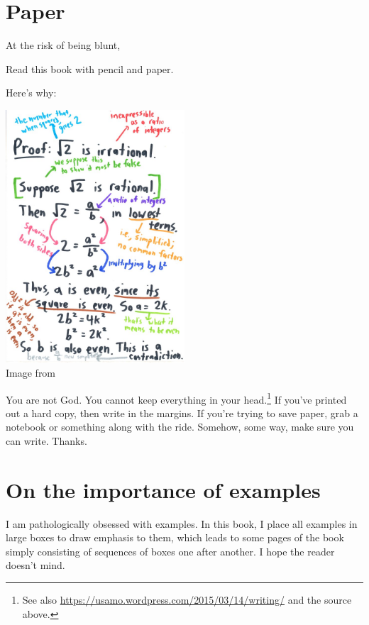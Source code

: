 
\section{Paper}
At the risk of being blunt,
\begin{moral}
Read this book with pencil and paper.
\end{moral}
Here's why:

\begin{center}
	\includegraphics[width=0.5\textwidth]{media/read-with-pencil.jpg}
	\\ \scriptsize Image from \cite{img:read_with_pencil}
\end{center}
You are not God.
You cannot keep everything in your head.\footnote{
	See also \url{https://usamo.wordpress.com/2015/03/14/writing/}
	and the source above.}
If you've printed out a hard copy, then write in the margins.
If you're trying to save paper,
grab a notebook or something along with the ride.
Somehow, some way, make sure you can write. Thanks.

\section{On the importance of examples}
I am pathologically obsessed with examples.
In this book, I place all examples in large boxes to draw emphasis to them,
which leads to some pages of the book simply consisting of sequences of boxes
one after another. I hope the reader doesn't mind.

